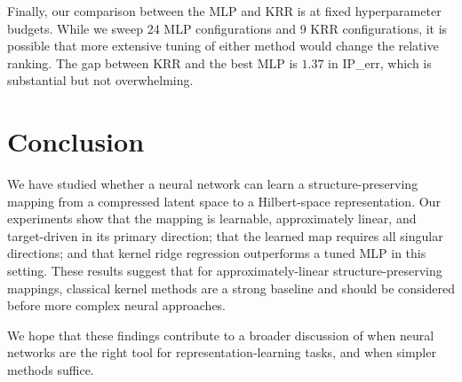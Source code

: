 \documentclass[11pt]{article}
\begin{document}
Finally, our comparison between the MLP and KRR is at fixed hyperparameter
budgets. While we sweep 24 MLP configurations and 9 KRR configurations, it
is possible that more extensive tuning of either method would change the
relative ranking. The gap between KRR and the best MLP is $1.37$ in IP\_err,
which is substantial but not overwhelming.

\section{Conclusion}

We have studied whether a neural network can learn a structure-preserving
mapping from a compressed latent space to a Hilbert-space representation.
Our experiments show that the mapping is learnable, approximately linear,
and target-driven in its primary direction; that the learned map requires
all singular directions; and that kernel ridge regression outperforms a
tuned MLP in this setting. These results suggest that for
approximately-linear structure-preserving mappings, classical kernel
methods are a strong baseline and should be considered before more complex
neural approaches.

We hope that these findings contribute to a broader discussion of when
neural networks are the right tool for representation-learning tasks, and
when simpler methods suffice.



\end{document}
